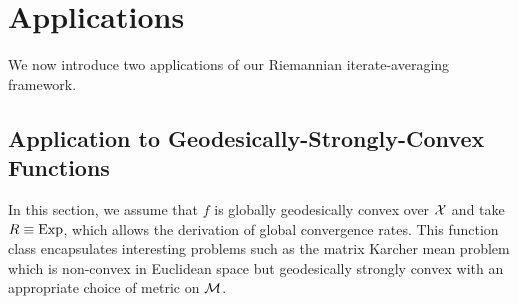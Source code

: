 \section{Applications} \label{sec:application}
\vspace{-.1cm}
We now introduce two applications of our Riemannian iterate-averaging framework.
\vspace{-0.3cm}
\subsection{Application to Geodesically-Strongly-Convex Functions}
\vspace{-.0856cm}
\label{sec:geostrong}
In this section, we assume that $f$ is globally geodesically convex over $\mathcal{X}$ and take $R \equiv \Exp$, which allows the derivation of global convergence rates. This function class encapsulates interesting problems such as the matrix Karcher mean problem
 \citep{bini2013computing} which is non-convex in Euclidean space but geodesically strongly convex with an appropriate choice of metric on $\mathcal{M}$.

